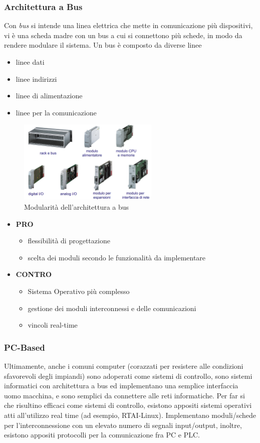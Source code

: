 \documentclass[10pt, letterpaper]{report}
\begin{document}
\subsubsection{Architettura a Bus}
Con \textit{bus} si intende una linea elettrica che mette in comunicazione più dispositivi, vi è una scheda madre 
con un bus a cui si connettono più schede, in modo da rendere modulare il sistema. Un bus è composto da diverse 
linee\begin{itemize}
    \item linee dati 
    \item linee indirizzi 
    \item linee di alimentazione 
    \item linee per la comunicazione
\end{itemize}
\begin{figure}[h!]
    \centering
    \includegraphics[width=0.6\textwidth ]{images/bus.png}
    \caption{Modularità dell'architettura a bus}
\end{figure}
\begin{itemize}
    \item \textbf{PRO}\begin{itemize}
        \item flessibilità di progettazione 
        \item scelta dei moduli secondo le funzionalità da implementare
    \end{itemize}
    \item \textbf{CONTRO}\begin{itemize}
        \item Sistema Operativo più complesso
        \item  gestione dei moduli interconnessi e delle comunicazioni
        \item  vincoli real-time  
    \end{itemize}
\end{itemize}
\subsubsection{PC-Based}
Ultimamente, anche i comuni computer (corazzati per resistere alle condizioni 
sfavorevoli degli impiandi) sono adoperati  come sistemi di controllo, sono sistemi informatici con architettura  
a bus ed implementano una semplice interfaccia uomo macchina, e sono semplici da connettere alle reti informatiche.\acc 
Per far si che risultino efficaci come sistemi di controllo, esistono appositi sistemi operativi atti 
all'utilizzo real time (ad esempio, RTAI-Linux). Implementano 
moduli/schede per l'interconnessione con un elevato numero di 
segnali input/output, inoltre, esistono appositi protocolli per la comunicazione fra PC e PLC.
\flowerLine
\end{document}
